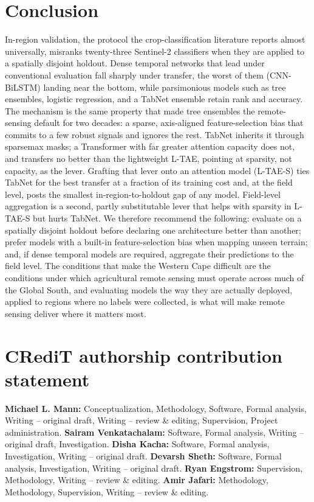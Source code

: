 \documentclass[preprint,authoryear]{elsarticle}
\begin{document}
\section{Conclusion}
In-region validation, the protocol the crop-classification literature reports almost universally, misranks twenty-three Sentinel-2 classifiers when they are applied to a spatially disjoint holdout. Dense temporal networks that lead under conventional evaluation fall sharply under transfer, the worst of them (CNN-BiLSTM) landing near the bottom, while parsimonious models such as tree ensembles, logistic regression, and a TabNet ensemble retain rank and accuracy. The mechanism is the same property that made tree ensembles the remote-sensing default for two decades: a sparse, axis-aligned feature-selection bias that commits to a few robust signals and ignores the rest. TabNet inherits it through sparsemax masks; a Transformer with far greater attention capacity does not, and transfers no better than the lightweight L-TAE, pointing at sparsity, not capacity, as the lever. Grafting that lever onto an attention model (L-TAE-S) ties TabNet for the best transfer at a fraction of its training cost and, at the field level, posts the smallest in-region-to-holdout gap of any model. Field-level aggregation is a second, partly substitutable lever that helps with sparsity in L-TAE-S but hurts TabNet. We therefore recommend the following: evaluate on a spatially disjoint holdout before declaring one architecture better than another; prefer models with a built-in feature-selection bias when mapping unseen terrain; and, if dense temporal models are required, aggregate their predictions to the field level. The conditions that make the Western Cape difficult are the conditions under which agricultural remote sensing must operate across much of the Global South, and evaluating models the way they are actually deployed, applied to regions where no labels were collected, is what will make remote sensing deliver where it matters most.

\section*{CRediT authorship contribution statement}
\textbf{Michael L. Mann:} Conceptualization, Methodology, Software, Formal analysis, Writing -- original draft, Writing -- review \& editing, Supervision, Project administration.
\textbf{Sairam Venkatachalam:} Software, Formal analysis, Writing -- original draft, Investigation.
\textbf{Disha Kacha:} Software, Formal analysis, Investigation, Writing -- original draft.
\textbf{Devarsh Sheth:} Software, Formal analysis, Investigation, Writing -- original draft.
\textbf{Ryan Engstrom:} Supervision, Methodology, Writing -- review \& editing.
\textbf{Amir Jafari:} Methodology, Methodology, Supervision, Writing -- review \& editing.
\end{document}
